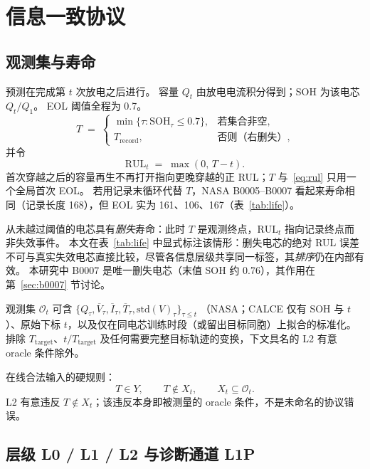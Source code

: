 \documentclass[UTF8,a4paper,12pt]{ctexart}
\begin{document}
\section{信息一致协议}
\label{sec:protocol}

\subsection{观测集与寿命}
\label{sec:Ot}

预测在完成第 $t$ 次放电之后进行。
容量 $Q_t$ 由放电电流积分得到；SOH 为该电芯 $Q_t/Q_1$。
EOL 阈值全程为 0.7。
\begin{equation}
T \;=\;
\begin{cases}
\min\{ \tau: \mathrm{SOH}_\tau \le 0.7\}, & \text{若集合非空},\\
T_{\mathrm{record}}, & \text{否则（右删失）},
\end{cases}
\end{equation}
并令
\begin{equation}
\label{eq:rul}
\mathrm{RUL}_t \;=\; \max(0,\, T-t).
\end{equation}
首次穿越之后的容量再生不再打开指向更晚穿越的正 RUL；$T$ 与~\eqref{eq:rul} 只用一个全局首次 EOL。
若用记录末循环代替 $T$，NASA B0005--B0007 看起来寿命相同（记录长度 168），但 EOL 实为 161、106、167（表~\ref{tab:life}）。

从未越过阈值的电芯具有\emph{删失}寿命：此时 $T$ 是观测终点，$\mathrm{RUL}_t$ 指向记录终点而非失效事件。
本文在表~\ref{tab:life} 中显式标注该情形：删失电芯的绝对 RUL 误差不可与真实失效电芯直接比较，尽管各信息层级共享同一标签，其\emph{排序}仍在内部有效。
本研究中 B0007 是唯一删失电芯（末值 SOH 约 0.76），其作用在第~\ref{sec:b0007} 节讨论。


观测集 $\mathcal{O}_t$ 可含
$\{Q_\tau,\overline{V}_\tau,\overline{I}_\tau,\overline{T}_\tau,\mathrm{std}(V)_\tau\}_{\tau\le t}$
（NASA；CALCE 仅有 SOH 与 $t$）、原始下标 $t$，以及仅在同电芯训练时段（或留出目标同胞）上拟合的标准化。
排除 $T_{\mathrm{target}}$、$t/T_{\mathrm{target}}$ 及任何需要完整目标轨迹的变换，下文具名的 L2 有意 oracle 条件除外。

在线合法输入的硬规则：
\begin{equation}
\boxed{T\in Y,\qquad T\notin X_t,\qquad X_t\subseteq\mathcal{O}_t.}
\end{equation}
L2 有意违反 $T\notin X_t$；该违反本身即被测量的 oracle 条件，不是未命名的协议错误。

\subsection{层级 L0 / L1 / L2 与诊断通道 L1P}
\label{sec:levels}
\end{document}
